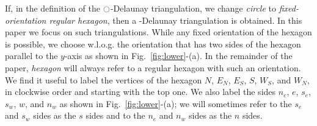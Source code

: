 






If, in the definition of the $\ocircle$-Delaunay triangulation, we change
{\em circle} to {\em fixed-orientation regular hexagon}, then a
{\Large\varhexagon}-Delaunay triangulation is obtained. In this paper
we focus on such triangulations. While any fixed orientation of the
hexagon is possible, we choose w.l.o.g. the orientation that has two sides of
the hexagon parallel to the $y$-axis as shown in Fig.~\ref{fig:lower}-(a).
In the remainder of the paper, {\em hexagon} will always refer to a regular
hexagon with such an orientation. We find it useful to label the vertices of
the hexagon $N$, $E_N$, $E_S$, $S$, $W_S$, and $W_N$, in clockwise order and
starting with the
top one. We also label the sides $n_e$, $e$, $s_e$, $s_w$, $w$, and $n_w$ as
shown in  Fig.~\ref{fig:lower}-(a); we will sometimes refer to the $s_e$
and $s_w$ sides as the $s$ sides and to the $n_e$ and $n_w$ sides as the $n$
sides.

\iftoggle{abstract}
{\begin{figure}}
{\begin{figure}[!b]}
\caption{(a) The hexagon orientation and the side and vertex labels that we
use (b) A {\Large\varhexagon}-Delaunay triangulation with points
$p$, $q$, $p_k$, and $q_0$ having coordinates $(0,0)$,
$(1, \frac{1}{\sqrt{3}})$, $(\delta, \frac{2}{\sqrt{3}}-\sqrt{3}\delta)$,
and $(1-\delta, -\frac{1}{\sqrt{3}}+\sqrt{3}\delta)$, respectively.
\iftoggle{abstract}{For $\delta$ small enough, $d_T(p,q) \geq (2-\epsilon)d_2(p,q)$.}{} (c) A closer look at the bottom faces of this triangulation.}

